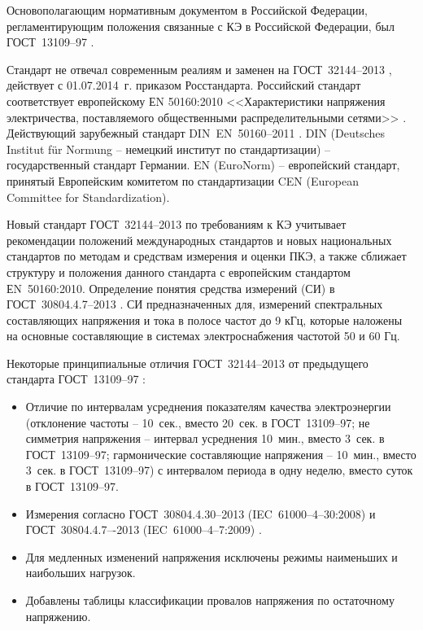 
Основополагающим нормативным документом в Российской Федерации, регламентирующим положения связанные с КЭ в Российской Федерации, был ГОСТ~13109--97 \cite{ГОСТ13109-97}. 

Стандарт не отвечал современным реалиям и заменен на ГОСТ~32144--2013 \cite{ГОСТ32144-2013}, действует с 01.07.2014~г. приказом Росстандарта. Российский стандарт соответствует европейскому ЕN 50160:2010 <<Характеристики напряжения электричества, поставляемого общественными распределительными сетями>> \cite{ЕN50160:2010}. Действующий зарубежный стандарт DIN~EN~50160--2011 \cite{DINEN50160-2011}. DIN (Deutsches Institut für Normung – немецкий институт по стандартизации) – государственный стандарт Германии. EN (EuroNorm) – европейский стандарт, принятый Европейским комитетом по стандартизации CEN (European Committee for Standardization).


Новый стандарт ГОСТ~32144--2013 по требованиям к КЭ учитывает рекомендации положений международных стандартов и новых национальных стандартов по методам и средствам измерения и оценки ПКЭ, а также сближает структуру и положения данного стандарта с европейским стандартом ЕN~50160:2010.
Определение понятия средства измерений (СИ) в ГОСТ~30804.4.7--2013 \cite{ГОСТ30804.4.7-2013}.
СИ предназначенных для, измерений спектральных составляющих напряжения и тока в полосе частот до 9 кГц, которые наложены на основные составляющие в системах электроснабжения частотой 50 и 60 Гц.


Некоторые принципиальные отличия  ГОСТ~32144--2013 \cite{ГОСТ32144-2013} от предыдущего стандарта ГОСТ~13109--97 \cite{ГОСТ13109-97}: 
\begin{itemize}
	\item Отличие по интервалам усреднения показателям качества электроэнергии (отклонение частоты -- 10~сек., вместо 20~сек. в ГОСТ~13109--97; не симметрия напряжения -- интервал усреднения 10~мин., вместо 3~сек. в ГОСТ~13109--97; гармонические составляющие напряжения -- 10~мин., вместо 3~сек. в ГОСТ~13109--97) с интервалом периода в одну неделю, вместо суток в ГОСТ~13109--97.
	\item Измерения согласно ГОСТ~30804.4.30--2013 (IEC~61000--4--30:2008) \cite{ГОСТ30804.4.30-2013} и ГОСТ~30804.4.7–-2013 (IEC~61000--4--7:2009) \cite{ГОСТ30804.4.7-2013}.
	\item Для медленных изменений напряжения исключены режимы наименьших и наибольших нагрузок.
	\item Добавлены таблицы классификации провалов напряжения по остаточному напряжению.
\end{itemize}

